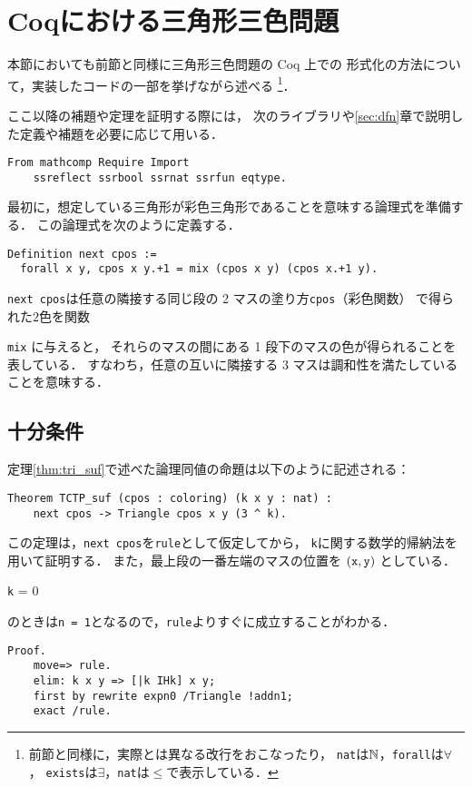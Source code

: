 \section{Coqにおける三角形三色問題}
本節においても前節と同様に三角形三色問題の Coq 上での
形式化の方法について，実装したコードの一部を挙げながら述べる
\footnote
    {
      前節と同様に，実際とは異なる改行をおこなったり，
      {\tt{nat}}は$\mathbb{N}$，{\tt{forall}}は$\forall$，
      {\tt{exists}}は$\exists$，{\tt{nat}}は$\leq$で表示している．
    }．

ここ以降の補題や定理を証明する際には，
次のライブラリや\ref{sec:dfn}章で説明した定義や補題を必要に応じて用いる．
\begin{lstlisting}[language=Coq]
  From mathcomp Require Import
    ssreflect ssrbool ssrnat ssrfun eqtype.
\end{lstlisting}

最初に，想定している三角形が彩色三角形であることを意味する論理式を準備する．
この論理式を次のように定義する．
\begin{lstlisting}[language=Coq]
 Definition next cpos :=
  forall x y, cpos x y.+1 = mix (cpos x y) (cpos x.+1 y).
\end{lstlisting}
{{\tt{next cpos}}は任意の隣接する同じ段の 2 マスの塗り方{\tt{cpos}}（彩色関数） で得られた$2$色を関数{{\tt{mix}} に与えると，
それらのマスの間にある 1 段下のマスの色が得られることを表している．
すなわち，任意の互いに隣接する 3 マスは調和性を満たしていることを意味する．
  
\subsection{十分条件}
定理\ref{thm:tri_suf}で述べた論理同値の命題は以下のように記述される：
\begin{lstlisting}[language=Coq]
  Theorem TCTP_suf (cpos : coloring) (k x y : nat) :
    next cpos -> Triangle cpos x y (3 ^ k).
\end{lstlisting}
この定理は，{\tt{next cpos}}を{\tt{rule}}として仮定してから，
{\tt{k}}に関する数学的帰納法を用いて証明する．
また，最上段の一番左端のマスの位置を $({\tt{x}},{\tt{y}})$ としている．

{\tt{k}} = 0}}のときは{\tt{n = 1}}となるので，{\tt{rule}}よりすぐに成立することがわかる．
\begin{lstlisting}[language=Coq]
  Proof.
    move=> rule.
    elim: k x y => [|k IHk] x y;
    first by rewrite expn0 /Triangle !addn1;
    exact /rule.
\end{lstlisting}

